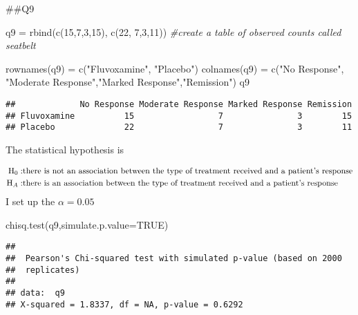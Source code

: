\documentclass[
]{article}
\newenvironment{Shaded}{\begin{snugshade}}{\end{snugshade}}
\newcommand{\AttributeTok}[1]{\textcolor[rgb]{0.77,0.63,0.00}{#1}}
\newcommand{\CommentTok}[1]{\textcolor[rgb]{0.56,0.35,0.01}{\textit{#1}}}
\newcommand{\ConstantTok}[1]{\textcolor[rgb]{0.00,0.00,0.00}{#1}}
\newcommand{\DecValTok}[1]{\textcolor[rgb]{0.00,0.00,0.81}{#1}}
\newcommand{\FunctionTok}[1]{\textcolor[rgb]{0.00,0.00,0.00}{#1}}
\newcommand{\NormalTok}[1]{#1}
\newcommand{\OtherTok}[1]{\textcolor[rgb]{0.56,0.35,0.01}{#1}}
\newcommand{\StringTok}[1]{\textcolor[rgb]{0.31,0.60,0.02}{#1}}
\begin{document}
\#\#Q9

\begin{Shaded}
\begin{Highlighting}[]
\NormalTok{q9 }\OtherTok{=} \FunctionTok{rbind}\NormalTok{(}\FunctionTok{c}\NormalTok{(}\DecValTok{15}\NormalTok{,}\DecValTok{7}\NormalTok{,}\DecValTok{3}\NormalTok{,}\DecValTok{15}\NormalTok{), }\FunctionTok{c}\NormalTok{(}\DecValTok{22}\NormalTok{, }\DecValTok{7}\NormalTok{,}\DecValTok{3}\NormalTok{,}\DecValTok{11}\NormalTok{))  }\CommentTok{\#create a table of observed counts called seatbelt}

\FunctionTok{rownames}\NormalTok{(q9) }\OtherTok{=} \FunctionTok{c}\NormalTok{(}\StringTok{"Fluvoxamine"}\NormalTok{, }\StringTok{"Placebo"}\NormalTok{)}
\FunctionTok{colnames}\NormalTok{(q9) }\OtherTok{=} \FunctionTok{c}\NormalTok{(}\StringTok{"No Response"}\NormalTok{, }\StringTok{"Moderate Response"}\NormalTok{,}\StringTok{"Marked Response"}\NormalTok{,}\StringTok{"Remission"}\NormalTok{)}
\NormalTok{q9}
\end{Highlighting}
\end{Shaded}

\begin{verbatim}
##             No Response Moderate Response Marked Response Remission
## Fluvoxamine          15                 7               3        15
## Placebo              22                 7               3        11
\end{verbatim}

The statistical hypothesis is

\[
\begin{align}
{\rm H}_{0}: & \text{there is not an association between the type of treatment received and a patient’s response} \\
{\rm H}_{A}: & \text{there is an association between the type of treatment received and a patient’s response} \\
\end{align}
\] I set up the \(\alpha = 0.05\)

\begin{Shaded}
\begin{Highlighting}[]
\FunctionTok{chisq.test}\NormalTok{(q9,}\AttributeTok{simulate.p.value=}\ConstantTok{TRUE}\NormalTok{)}
\end{Highlighting}
\end{Shaded}

\begin{verbatim}
## 
##  Pearson's Chi-squared test with simulated p-value (based on 2000
##  replicates)
## 
## data:  q9
## X-squared = 1.8337, df = NA, p-value = 0.6292
\end{verbatim}
\end{document}
